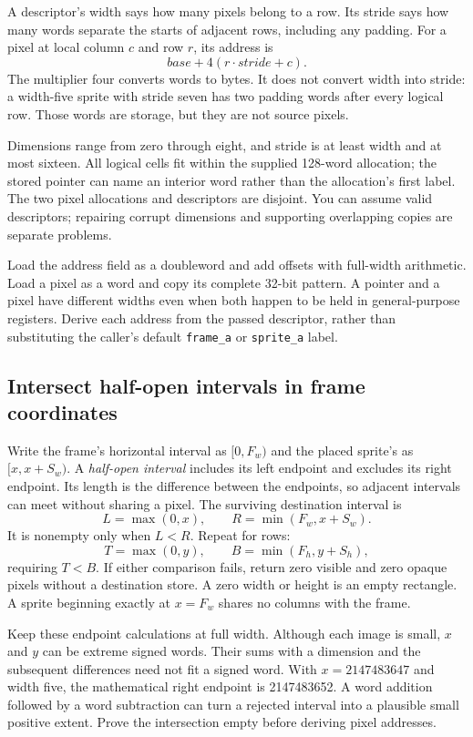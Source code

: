 

A descriptor's width says how many pixels belong to a row. Its stride says how
many words separate the starts of adjacent rows, including any padding. For a
pixel at local column $c$ and row $r$, its address is
\[
  base+4(r\cdot stride+c).
\]
The multiplier four converts words to bytes. It does not convert width into
stride: a width-five sprite with stride seven has two padding words after every
logical row. Those words are storage, but they are not source pixels.

Dimensions range from zero through eight, and stride is at least width and at
most sixteen. All logical cells fit within the supplied 128-word allocation;
the stored pointer can name an interior word rather than the allocation's first
label. The two pixel allocations and descriptors are disjoint. You can assume
valid descriptors; repairing corrupt dimensions and supporting overlapping copies
are separate problems.

Load the address field as a doubleword and add offsets with full-width arithmetic.
Load a pixel as a word and copy its complete 32-bit pattern. A pointer and a pixel
have different widths even when both happen to be held in general-purpose
registers. Derive each address from the passed descriptor, rather than substituting
the caller's default \texttt{frame\_a} or \texttt{sprite\_a} label.

\subsection*{Intersect half-open intervals in frame coordinates}

Write the frame's horizontal interval as $[0,F_w)$ and the placed sprite's as
$[x,x+S_w)$. A \emph{half-open interval} includes its left endpoint and excludes
its right endpoint. Its length is the difference between the endpoints, so adjacent
intervals can meet without sharing a pixel. The surviving destination interval is
\[
  L=\max(0,x),\qquad R=\min(F_w,x+S_w).
\]
It is nonempty only when $L<R$. Repeat for rows:
\[
  T=\max(0,y),\qquad B=\min(F_h,y+S_h),
\]
requiring $T<B$. If either comparison fails, return zero visible and zero opaque
pixels without a destination store. A zero width or height is an empty rectangle.
A sprite beginning exactly at $x=F_w$ shares no columns with the frame.

Keep these endpoint calculations at full width. Although each image is small,
$x$ and $y$ can be extreme signed words. Their sums with a dimension and the
subsequent differences need not fit a signed word. With $x=2147483647$ and width
five, the mathematical right endpoint is 2147483652. A word addition followed by
a word subtraction can turn a rejected interval into a plausible small positive
extent. Prove the intersection empty before deriving pixel addresses.

